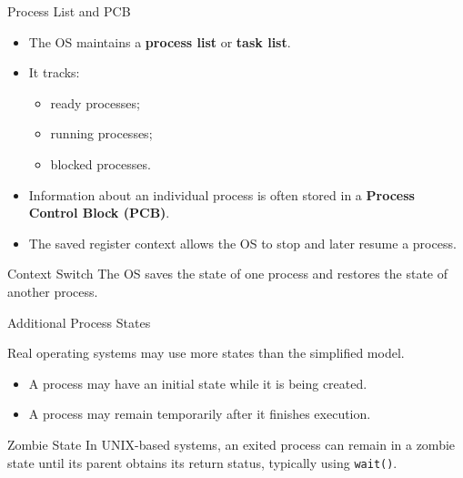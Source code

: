 \begin{frame}{Process List and PCB}

\begin{itemize}
    \item The OS maintains a \textbf{process list} or \textbf{task list}.
    \item It tracks:
    \begin{itemize}
        \item ready processes;
        \item running processes;
        \item blocked processes.
    \end{itemize}
    \item Information about an individual process is often stored in a
          \textbf{Process Control Block (PCB)}.
    \item The saved register context allows the OS to stop and later
          resume a process.
\end{itemize}

\begin{block}{Context Switch}
The OS saves the state of one process and restores the state
of another process.
\end{block}

\end{frame}

\begin{frame}{Additional Process States}

Real operating systems may use more states than the simplified model.

\begin{itemize}
    \item A process may have an initial state while it is being created.
    \item A process may remain temporarily after it finishes execution.
\end{itemize}

\begin{block}{Zombie State}
In UNIX-based systems, an exited process can remain in a zombie
state until its parent obtains its return status, typically using
\texttt{wait()}.
\end{block}

\end{frame}

